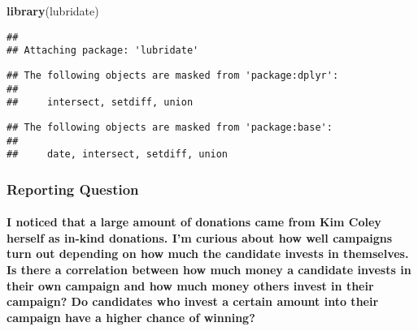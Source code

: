 \documentclass[
]{article}
\newenvironment{Shaded}{\begin{snugshade}}{\end{snugshade}}
\newcommand{\KeywordTok}[1]{\textcolor[rgb]{0.13,0.29,0.53}{\textbf{#1}}}
\newcommand{\NormalTok}[1]{#1}
\begin{document}
\begin{Shaded}
\begin{Highlighting}[]
\KeywordTok{library}\NormalTok{(lubridate)}
\end{Highlighting}
\end{Shaded}

\begin{verbatim}
## 
## Attaching package: 'lubridate'
\end{verbatim}

\begin{verbatim}
## The following objects are masked from 'package:dplyr':
## 
##     intersect, setdiff, union
\end{verbatim}

\begin{verbatim}
## The following objects are masked from 'package:base':
## 
##     date, intersect, setdiff, union
\end{verbatim}

\hypertarget{reporting-question}{%
\subsubsection{Reporting Question}\label{reporting-question}}

\hypertarget{i-noticed-that-a-large-amount-of-donations-came-from-kim-coley-herself-as-in-kind-donations.-im-curious-about-how-well-campaigns-turn-out-depending-on-how-much-the-candidate-invests-in-themselves.-is-there-a-correlation-between-how-much-money-a-candidate-invests-in-their-own-campaign-and-how-much-money-others-invest-in-their-campaign-do-candidates-who-invest-a-certain-amount-into-their-campaign-have-a-higher-chance-of-winning}{%
\paragraph{I noticed that a large amount of donations came from Kim
Coley herself as in-kind donations. I'm curious about how well campaigns
turn out depending on how much the candidate invests in themselves. Is
there a correlation between how much money a candidate invests in their
own campaign and how much money others invest in their campaign? Do
candidates who invest a certain amount into their campaign have a higher
chance of
winning?}\label{i-noticed-that-a-large-amount-of-donations-came-from-kim-coley-herself-as-in-kind-donations.-im-curious-about-how-well-campaigns-turn-out-depending-on-how-much-the-candidate-invests-in-themselves.-is-there-a-correlation-between-how-much-money-a-candidate-invests-in-their-own-campaign-and-how-much-money-others-invest-in-their-campaign-do-candidates-who-invest-a-certain-amount-into-their-campaign-have-a-higher-chance-of-winning}}
\end{document}
